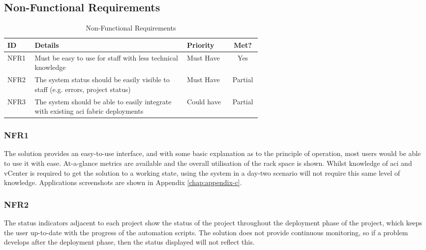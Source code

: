 \subsection{Non-Functional Requirements}

\begin{center}
    \begin{table}[H]
        \begin{tabular}{l p{0.6\linewidth} l c}
            \textbf{ID}             & \textbf{Details}
                                    & \textbf{Priority}
                                    & \textbf{Met?}
            \\ \hline
            NFR1                    & Must be easy to use for staff with less technical
            knowledge
                                    & Must Have
                                    & \cellcolor{green!25}Yes
            \\ \hline
            NFR2                    & The system status should be easily visible to staff (e.g.
            errors, project status) & Must Have
                                    & \cellcolor{yellow!25}Partial
                                                                             \\ \hline
            NFR3                    & The system should be able to easily integrate with existing \gls{aci} fabric deployments & Could have & \cellcolor{yellow!25}Partial
        \end{tabular}
        \caption{Non-Functional Requirements}
        \label{table:evaluation-non-functional-requirements}
    \end{table}
\end{center}

\subsubsection{NFR1}
The solution provides an easy-to-use interface, and with some basic explanation as to the principle of operation, most users would be able to use it with ease. At-a-glance metrics are available and the overall utilisation of the rack space is shown. Whilst knowledge of \gls{aci} and vCenter is required to get the solution to a working state, using the system in a day-two scenario will not require this same level of knowledge. Applications screenshots are shown in Appendix \ref{chap:appendix-c}.

\subsubsection{NFR2}
The status indicators adjacent to each project show the status of the project throughout the deployment phase of the project, which keeps the user up-to-date with the progress of the automation scripts. The solution does not provide continuous monitoring, so if a problem develops after the deployment phase, then the status displayed will not reflect this.

